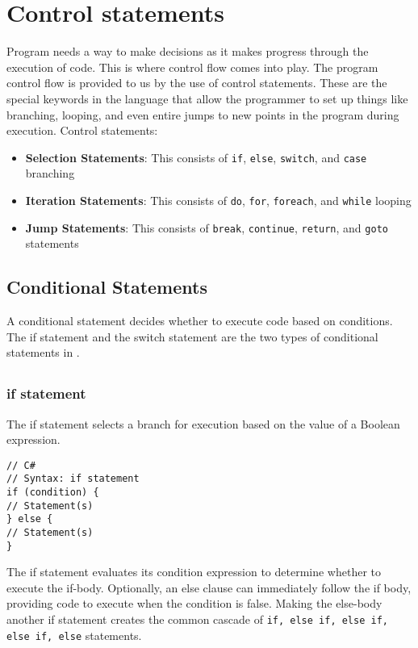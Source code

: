 \section{Control statements}
Program needs a way to make decisions as it makes progress through the execution of code. This is where control flow comes into play. The program control flow is provided to us by the use of control statements. These are the special keywords in the {\cs} language that allow the programmer to set up things like branching, looping, and even entire jumps to new points in the program during execution.
Control statements:
\begin{itemize}
	\item \textbf{Selection Statements}: This consists of \verb|if|, \verb|else|, \verb|switch|, and \verb|case| branching

	\item \textbf{Iteration Statements}: This consists of \verb|do|, \verb|for|, \verb|foreach|, and \verb|while| looping

	\item \textbf{Jump Statements}: This consists of \verb|break|, \verb|continue|, \verb|return|, and \verb|goto| statements
\end{itemize}

\subsection{Conditional Statements}
A conditional statement decides whether to execute code based on conditions. The if statement and the switch statement are the two types of conditional statements in {\cs}.

\subsection{{\cs}}
\subsubsection*{if statement}
The if statement selects a branch for execution based on the value of a Boolean expression.
\begin{lstlisting}[numbers=none]
// C#
// Syntax: if statement
if (condition) {
// Statement(s)
} else {
// Statement(s)
}
\end{lstlisting}

The if statement evaluates its condition expression to determine whether to execute the if-body. Optionally, an else clause can immediately follow the if body, providing code to execute when the condition is false. Making the else-body another if statement creates the common cascade of \verb|if, else if, else if, else if, else| statements.

